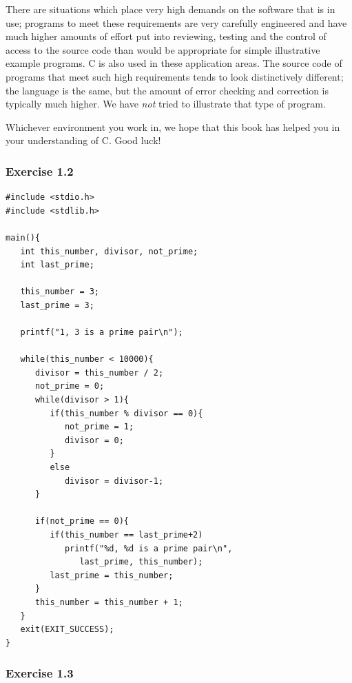  There are situations which place very high demands on the software that
   is in use; programs to meet these requirements are very carefully
   engineered and have much higher amounts of effort put into reviewing,
   testing and the control of access to the source code than would be
   appropriate for simple illustrative example programs. C is also used in
   these application areas.  The source code of programs that meet such high
   requirements tends to look distinctively different; the language is the
   same, but the amount of error checking and correction is typically much
   higher. We have \textit{not} tried to illustrate that type of
   program.


  Whichever environment you work in, we hope that this book has helped
   you in your understanding of C. Good luck!






  

         \subsubsection*{Exercise 1.2}


   \begin{Verbatim}
#include <stdio.h>
#include <stdlib.h>

main(){
   int this_number, divisor, not_prime;
   int last_prime;

   this_number = 3;
   last_prime = 3;

   printf("1, 3 is a prime pair\n");

   while(this_number < 10000){
      divisor = this_number / 2;
      not_prime = 0;
      while(divisor > 1){
         if(this_number % divisor == 0){
            not_prime = 1;
            divisor = 0;
         }
         else
            divisor = divisor-1;
      }

      if(not_prime == 0){
         if(this_number == last_prime+2)
            printf("%d, %d is a prime pair\n",
               last_prime, this_number);
         last_prime = this_number;
      }
      this_number = this_number + 1;
   }
   exit(EXIT_SUCCESS);
}
\end{Verbatim}

  

  \subsubsection*{Exercise 1.3}

